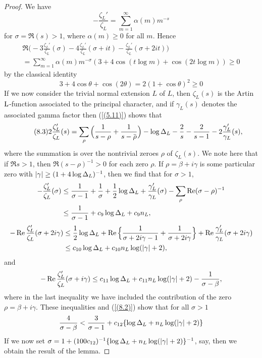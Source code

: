 \documentclass[./main]{subfiles}
\begin{document}
\begin{proof}
We have 
\[\tag{8.2}\label{(8.2)} -\frac{\zeta_L'}{\zeta_L} = \sum_{m=1}^{\infty} \alpha(m)m^{-s}
\]
for $\sigma = \Re(s) > 1$, where $\alpha(m) \geq 0$ for all $m$. Hence 
\begin{multline*}
    \Re\Big(-3\frac{\zeta_L'}{\zeta_L}(\sigma) - 4 \frac{\zeta_L'}{\zeta_L}(\sigma + it) - \frac{\zeta_L'}{\zeta_L}(\sigma + 2it)\Big) \\
    = \sum_{m=1}^{\infty} \alpha(m)m^{-\sigma}(3 + 4\cos(t \log m) + \cos(2t \log m)) \geq 0
\end{multline*}
by the classical identity
\[ 3 + 4\cos \theta + \cos(2\theta) = 2(1 + \cos \theta)^2 \geq 0
\]
If we now consider the trivial normal extension $L$ of $L$, then $\zeta_L(s)$ is the Artin $\operatorname{L}$-function associated to the principal character, and if $\gamma_L(s)$ denotes the associated gamma factor then (\ref{(5.11)}) shows that 
\[\tag{8.3}\label{(8.3)} 2 \frac{\zeta_L'}{\zeta_L}(s) = \sum_{\rho} \Big(\frac{1}{s-\rho} + \frac{1}{s-\xoverline{\rho}}\Big) - \log \disc_L - \frac{2}{s} - \frac{2}{s-1} - 2 \frac{\gamma_L'}{\gamma_L}(s),
\]
where the summation is over the nontrivial zeroes $\rho$ of $\zeta_L(s)$. We note here that if $\Re s > 1$, then $\Re(s-\rho)^{-1} > 0$ for each zero $\rho$. If $\rho = \beta + i \gamma$ is some particular zero with $|\gamma| \geq (1 + 4 \log \Delta_L)^{-1}$, then we find that for $\sigma > 1$, 
\begin{align*}
    -\frac{\zeta_L'}{\zeta_L}(\sigma) &\leq \frac{1}{\sigma - 1} + \frac{1}{\sigma} + \frac{1}{2}\log \Delta_L + \frac{\gamma_L'}{\gamma_L}(\sigma) - \sum_{\rho} \operatorname{Re}(\sigma - \rho)^{-1} \\
    &\leq \frac{1}{\sigma - 1} + c_9 \log \Delta_L + c_9n_L,
\end{align*}
\begin{align*}
    -\operatorname{Re} \frac{\zeta_L'}{\zeta_L}(\sigma + 2 i\gamma) &\leq \frac{1}{2} \log \Delta_L + \operatorname{Re} \Big\{\frac{1}{\sigma + 2i\gamma -1} + \frac{1}{\sigma + 2 i \gamma} \Big\} + \operatorname{Re} \frac{\gamma_L'}{\gamma_L}(\sigma + 2 i \gamma) \\
   & \leq c_{10} \log \Delta_L + c_{10} n_L \log(|\gamma| + 2),
\end{align*}
and 
\[-\operatorname{Re} \frac{\zeta_L'}{\zeta_L}(\sigma + i \gamma) \leq c_{11} \log \Delta_L + c_{11}n_L \log(|\gamma| + 2) - \frac{1}{\sigma - \beta},
\]
where in the last inequality we have included the contribution of the zero \newline $\rho = \beta + i \gamma$. These inequalities and (\ref{(8.2)}) show that for all $\sigma > 1$
\[ \frac{4}{\sigma - \beta} < \frac{3}{\sigma - 1} + c_{12}\{\log \Delta_L + n_L \log(|\gamma| + 2) \}
\]
If we now set $\sigma = 1 + (100c_{12})^{-1}\{\log \Delta_L + n_L \log(|\gamma|+2)\}^{-1}$, say, then we obtain the result of the lemma.
\end{proof}
\end{document}
